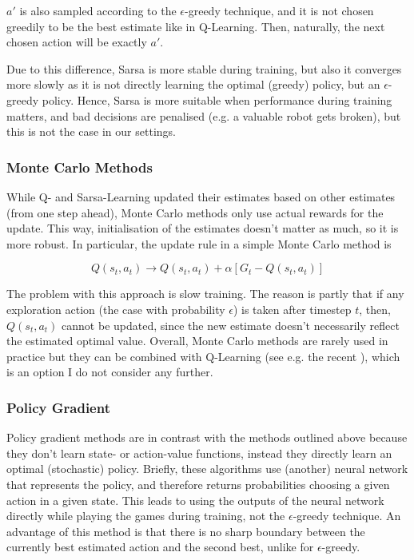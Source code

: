 $a'$ is also sampled according to the $\epsilon$-greedy technique, and it is not chosen greedily to be the best estimate like in Q-Learning. Then, naturally, the next chosen action will be exactly $a'$.

Due to this difference, Sarsa is more stable during training, but also it converges more slowly as it is not directly learning the optimal (greedy) policy, but an $\epsilon$-greedy policy. Hence, Sarsa is more suitable when performance during training matters, and bad decisions are penalised (e.g. a valuable robot gets broken), but this is not the case in our settings.

\subsubsection{Monte Carlo Methods}


While Q- and Sarsa-Learning updated their estimates based on other estimates (from one step ahead), Monte Carlo methods only use actual rewards for the update. This way, initialisation of the estimates doesn't matter as much, so it is more robust. In particular, the update rule in a simple Monte Carlo method is

\begin{equation} \label{eq:monte-carloUpdate}
Q(s_t,a_t) \longrightarrow Q(s_t,a_t) + \alpha[G_t - Q(s_t,a_t)]
\end{equation}

The problem with this approach is slow training. The reason is partly that if any exploration action (the case with probability $\epsilon$) is taken after timestep $t$, then, $Q(s_t,a_t)$ cannot be updated, since the new estimate doesn't necessarily reflect the estimated optimal value. Overall, Monte Carlo methods are rarely used in practice but they can be combined with Q-Learning (see e.g. the recent \cite{wang2018montecarloqlearning}), which is an option I do not consider any further.

\subsubsection{Policy Gradient}


Policy gradient methods are in contrast with the methods outlined above because they don't learn state- or action-value functions, instead they directly learn an optimal (stochastic) policy. Briefly, these algorithms use (another) neural network that represents the policy, and therefore returns probabilities choosing a given action in a given state. This leads to using the outputs of the neural network directly while playing the games during training, not the $\epsilon$-greedy technique. An advantage of this method is that there is no sharp boundary between the currently best estimated action and the second best, unlike for $\epsilon$-greedy. 



